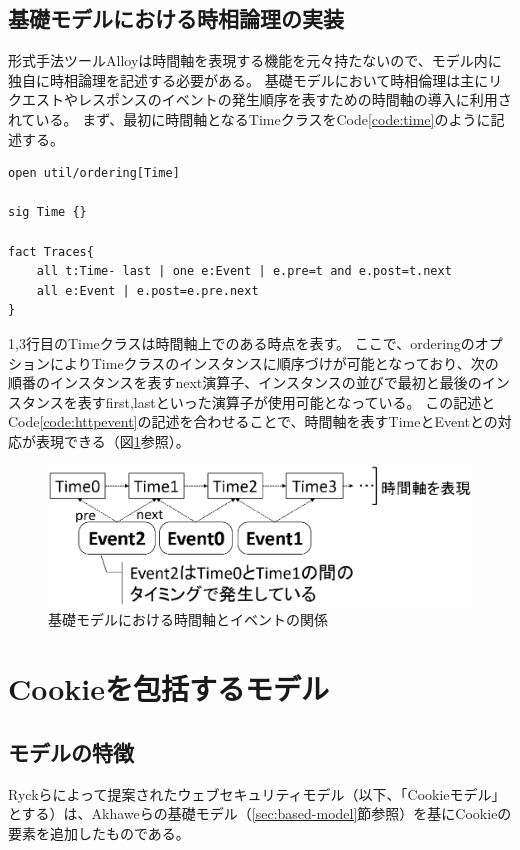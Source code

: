 \documentclass[12pt,a4paper]{jbook}
\begin{document}
\subsection{基礎モデルにおける時相論理の実装}
\label{sec:based-model-temporal-logic}
形式手法ツールAlloyは時間軸を表現する機能を元々持たないので、モデル内に独自に時相論理を記述する必要がある。
基礎モデルにおいて時相倫理は主にリクエストやレスポンスのイベントの発生順序を表すための時間軸の導入に利用されている。
まず、最初に時間軸となるTimeクラスをCode\ref{code:time}のように記述する。
\begin{lstlisting}[caption=基礎モデルにおける時間軸, label=code:time]
open util/ordering[Time]

sig Time {}

fact Traces{
	all t:Time- last | one e:Event | e.pre=t and e.post=t.next
	all e:Event | e.post=e.pre.next
}
\end{lstlisting}
1,3行目のTimeクラスは時間軸上でのある時点を表す。
ここで、orderingのオプションによりTimeクラスのインスタンスに順序づけが可能となっており、次の順番のインスタンスを表すnext演算子、インスタンスの並びで最初と最後のインスタンスを表すfirst,lastといった演算子が使用可能となっている。
この記述とCode\ref{code:httpevent}の記述を合わせることで、時間軸を表すTimeとEventとの対応が表現できる（図\ref{fig:based-model-temporal-logic}参照）。

\begin{figure}[htb]
\centering
\includegraphics[width=400pt]{./fig/based-model-temporal-logic.eps}
\caption{基礎モデルにおける時間軸とイベントの関係}
\label{fig:based-model-temporal-logic}
\end{figure}

\section{Cookieを包括するモデル}
\label{sec:cookie-model}
\subsection{モデルの特徴}
Ryckらによって提案されたウェブセキュリティモデル\cite{cookie-model}（以下、「Cookieモデル」とする）は、Akhaweらの基礎モデル（\ref{sec:based-model}節参照）を基にCookieの要素を追加したものである。
\end{document}
